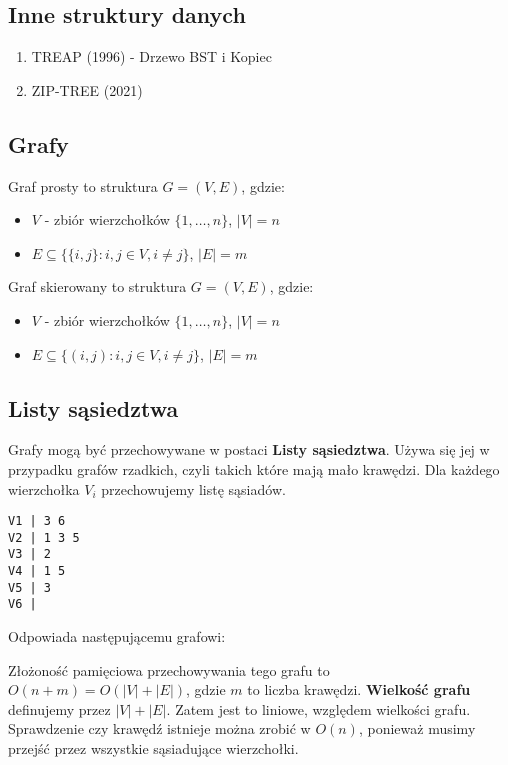 \documentclass{article}
\numberwithin{equation}{subsection}
\begin{document}
\subsection{Inne struktury danych}

\begin{enumerate}
    \item TREAP (1996) - Drzewo BST i Kopiec
    \item ZIP-TREE (2021)
\end{enumerate}

\subsection{Grafy}

Graf prosty to struktura $G=(V,E)$, gdzie:
\begin{itemize}
    \item $V$ - zbiór wierzchołków $\{1,\dots,n\}$, $|V|=n$
    \item $E\subseteq\{\{i,j\}:i,j\in V, i\neq j\}$, $|E|=m$
\end{itemize}

\noindent   
Graf skierowany to struktura $G=(V,E)$, gdzie:
\begin{itemize}
    \item $V$ - zbiór wierzchołków $\{1,\dots,n\}$, $|V|=n$
    \item $E\subseteq\{(i,j):i,j\in V, i\neq j\}$, $|E|=m$
\end{itemize}

\subsection{Listy sąsiedztwa}

Grafy mogą być przechowywane w postaci \textbf{Listy sąsiedztwa}. 
Używa się jej w przypadku grafów rzadkich, czyli takich które mają mało krawędzi.
Dla każdego wierzchołka $V_i$ przechowujemy listę sąsiadów.
\begin{verbatim}
V1 | 3 6
V2 | 1 3 5
V3 | 2
V4 | 1 5
V5 | 3
V6 | 
\end{verbatim}
Odpowiada następującemu grafowi:
\begin{center}
\end{center}
\noindent
Złożoność pamięciowa przechowywania tego grafu to $O(n+m)=O(|V|+|E|)$, gdzie $m$ to liczba krawędzi.
\textbf{Wielkość grafu} definujemy przez $|V|+|E|$. Zatem jest to liniowe, względem wielkości grafu.
Sprawdzenie czy krawędź istnieje można zrobić w $O(n)$, ponieważ musimy przejść przez wszystkie sąsiadujące wierzchołki.
\end{document}
